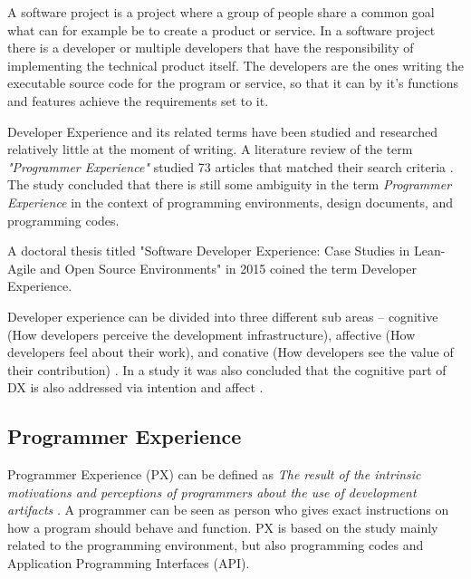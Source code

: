 \documentclass[english, 12pt, a4paper, sci, utf8, a-1b, online]{aaltothesis}
\begin{document}


A software project is a project where a group of people share a common goal what can for example be to create a product or service. In a software project there is a developer or multiple developers that have the responsibility of implementing the technical product itself. The developers are the ones writing the executable source code for the program or service, so that it can by it's functions and features achieve the requirements set to it.

Developer Experience and its related terms have been studied and researched relatively little at the moment of writing. A literature review of the term \textit{"Programmer Experience"} studied 73 articles that matched their search criteria \citep{programmer-experience}. The study concluded that there is still some ambiguity in the term \textit{Programmer Experience} in the context of programming environments, design documents, and programming codes.

A doctoral thesis titled "Software Developer Experience:
Case Studies in Lean-Agile and Open Source Environments" in 2015 coined the term Developer Experience.

Developer experience can be divided into three different sub areas – cognitive (How developers perceive the development infrastructure), affective (How developers feel about their work), and conative (How developers see the value of their contribution) \citep{fagerholm-dx-concept-and-definition}. In a study it was also concluded that the cognitive part of DX is also addressed via intention and affect \citep{kuusinen-flow}.

\subsection{Programmer Experience}


Programmer Experience (PX) can be defined as \textit{The result of the intrinsic motivations and perceptions of programmers about the use of development artifacts} \citep{programmer-experience}. A programmer can be seen as person who gives exact instructions on how a program should behave and function. PX is based on the study mainly related to the programming environment, but also programming codes and Application Programming Interfaces (API).
\end{document}
